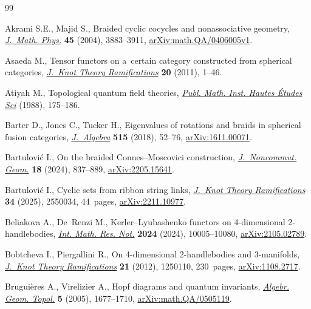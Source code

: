 \documentclass[10pt,a4paper]{amsart}
\numberwithin{equation}{section}
\begin{document}
\begin{thebibliography}{99}
\footnotesize\itemsep=0pt

Akrami S.E., Majid S., Braided cyclic cocycles and nonassociative geometry,
 \href{https://doi.org/10.1063/1.1787621}{\textit{J.~Math. Phys.}} \textbf{45}
 (2004), 3883--3911,
 \href{http://arxiv.org/abs/math.QA/0406005v1}{arXiv:math.QA/0406005v1}.

Asaeda M., Tensor functors on a~certain category constructed from spherical
 categories, \href{https://doi.org/10.1142/S0218216511008607}{\textit{J.~Knot
 Theory Ramifications}} \textbf{20} (2011), 1--46.

Atiyah M., Topological quantum field theories,
 \href{https://doi.org/10.1007/BF02698547}{\textit{Publ. Math. Inst. Hautes
 \'Etudes Sci}} (1988), 175--186.

Barter D., Jones C., Tucker H., Eigenvalues of rotations and braids in
 spherical fusion categories,
 \href{https://doi.org/10.1016/j.jalgebra.2018.08.011}{\textit{J.~Algebra}}
 \textbf{515} (2018), 52--76,
 \href{http://arxiv.org/abs/1611.00071}{arXiv:1611.00071}.

Bartulovi\'c I., On the braided {C}onnes--{M}oscovici construction,
 \href{https://doi.org/10.4171/jncg/541}{\textit{J.~Noncommut. Geom.}}
 \textbf{18} (2024), 837--889,
 \href{http://arxiv.org/abs/2205.15641}{arXiv:2205.15641}.

Bartulovi\'c I., Cyclic sets from ribbon string links,
 \href{https://doi.org/10.1142/S0218216525500348}{\textit{J.~Knot Theory
 Ramifications}} \textbf{34} (2025), 2550034, 44~pages,
 \href{http://arxiv.org/abs/2211.10977}{arXiv:2211.10977}.

Beliakova A., De~Renzi M., Kerler--{L}yubashenko functors on 4-dimensional
 2-handlebodies, \href{https://doi.org/10.1093/imrn/rnac039}{\textit{Int.
 Math. Res. Not.}} \textbf{2024} (2024), 10005--10080,
 \href{http://arxiv.org/abs/2105.02789}{arXiv:2105.02789}.

Bobtcheva I., Piergallini R., On 4-dimensional 2-handlebodies and 3-manifolds,
 \href{https://doi.org/10.1142/S0218216512501106}{\textit{J.~Knot Theory
 Ramifications}} \textbf{21} (2012), 1250110, 230~pages,
 \href{http://arxiv.org/abs/1108.2717}{arXiv:1108.2717}.

Brugui\`eres A., Virelizier A., Hopf diagrams and quantum invariants,
 \href{https://doi.org/10.2140/agt.2005.5.1677}{\textit{Algebr. Geom. Topol.}}
 \textbf{5} (2005), 1677--1710,
 \href{http://arxiv.org/abs/math.QA/0505119}{arXiv:math.QA/0505119}.


\end{thebibliography}
\end{document}

